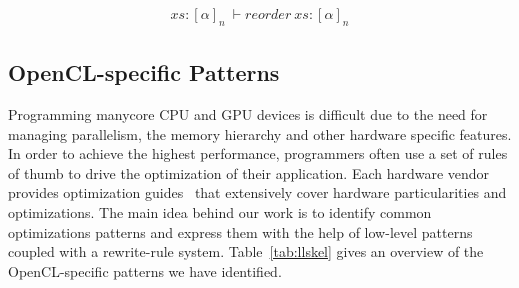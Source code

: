 \begin{align}
  xs : [\alpha]_n\ \vdash reorder\ xs : [\alpha]_n
\end{align}








\subsection{OpenCL-specific Patterns}

Programming manycore CPU and GPU devices is difficult due to the need for managing parallelism, the memory hierarchy and other hardware specific features.
In order to achieve the highest performance, programmers often use a set of rules of thumb to drive the optimization of their application.
Each hardware vendor provides optimization guides~\cite{nvidia11guide,amd12guide} that extensively cover hardware particularities and optimizations.
The main idea behind our work is to identify common optimizations patterns and express them with the help of low-level patterns coupled with a rewrite-rule system.
%
Table~\ref{tab:llskel} gives an overview of the OpenCL-specific patterns we have identified.

